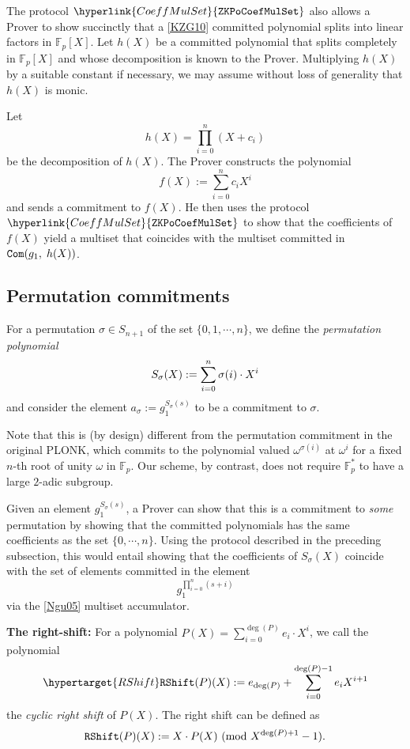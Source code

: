 \documentclass[11pt, lettersize, notitlepage, leqno, footskip=0.6cm]{article}
\newcommand{\bFp}{\mathbb{F}_p}
\newcommand{\vs}{\vspace{-0.15cm}}
\newcommand{\noin}{\noindent}
\newcommand{\Mod}[1]{\ (\mathrm{mod}\ #1)}
\numberwithin{equation}{section}
\begin{document}
The protocol $\hyperlink{CoeffMulSet}{\tt{ZKPoCoefMulSet}}$ also allows a Prover to show succinctly that a \hyperlink{KZG}{[KZG10]} committed polynomial splits into linear factors in $\bFp[X]$. Let $h(X)$ be a committed polynomial that splits completely in $\bFp[X]$ and whose decomposition is known to the Prover. Multiplying $h(X)$ by a suitable constant if necessary, we may assume without loss of generality that $h(X)$ is monic.

Let \vs $$ h(X) = \prod\limits_{i=0}^n (X+c_i) $$ be the decomposition of $h(X)$. The Prover constructs the polynomial \vs $$f(X):= \sum\limits_{i=0}^n c_iX^i $$ and sends a commitment to $f(X)$. He then uses the protocol $\hyperlink{CoeffMulSet}{\tt{ZKPoCoefMulSet}}$ to show that the coefficients of $f(X)$ yield a multiset that coincides with the multiset committed in ${\tt{Com}}(g_1,\;h(X))$. 



\bigskip


\subsection{\fontsize{11}{11}\selectfont Permutation commitments}

For a permutation $\sigma\in S_{n+1}$ of the set $\{0,1,\cdots, n\}$, we define the \textit{permutation polynomial} \vs $$ S_{\sigma}(X):= \sum\limits_{i=0}^n \sigma(i)\cdot X^i \vs $$ and consider the element $a_{\sigma}:= g_1^{S_{\sigma}(s)}$ to be a commitment to $\sigma$.

Note that this is (by design) different from the permutation commitment in the original PLONK, which commits to the polynomial valued $\omega^{\sigma(i)}$ at $\omega^i$ for a fixed $n$-th root of unity $\omega$ in $\bFp$. Our scheme, by contrast, does not require $\bFp^*$ to have a large $2$-adic subgroup. 

Given an element $g_1^{S_{\sigma}(s)}$, a Prover can show that this is a commitment to \textit{some} permutation by showing that the committed polynomials has the same coefficients as the set $\{0,\cdots,n\}$. Using the protocol described in the preceding subsection, this would entail showing that the coefficients of $S_{\sigma}(X)$ coincide with the set of elements committed in the element \vs $$ g_1^{\prod\limits_{i=0}^n (s+i)}  $$ via the \hyperlink{Ngu}{[Ngu05]} multiset accumulator.


\bigskip

\noin \textbf{The right-shift:} For a polynomial $P(X) = \sum\limits_{i=0}^{\deg(P)} e_i\cdot X^{i}$, we call the polynomial \vs $$ {\hypertarget{RShift}\tt{RShift}}(P)(X)  := e_{\deg(P)} + \sum\limits_{i=0}^{\deg(P)-1} e_{i} X^{i+1}  $$ the \textit{cyclic right shift} of $P(X)$. The right shift can be defined as \vs $$ {\tt{RShift}}(P)(X):= X\cdot P(X)\Mod{X^{\deg(P)+1}-1}.\vs  $$
\end{document}

